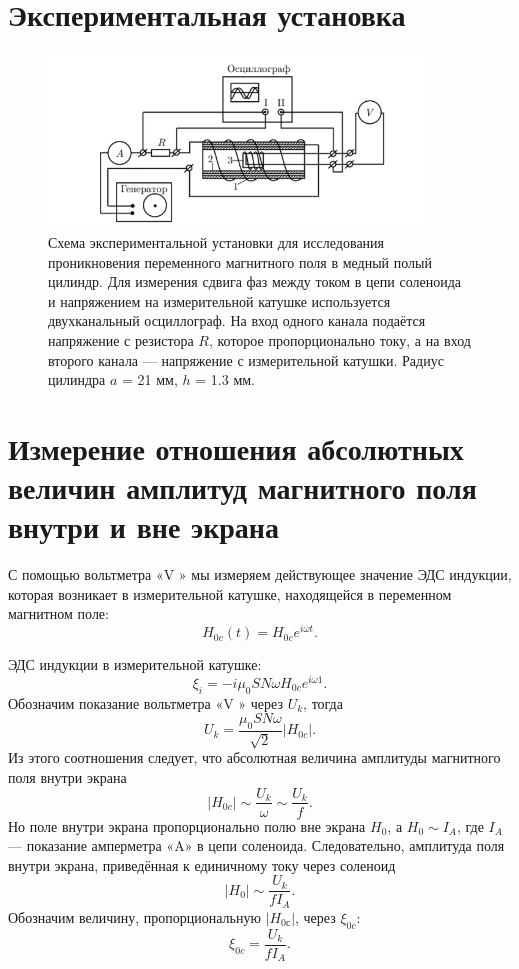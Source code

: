 \documentclass[a4paper, 14pt]{extarticle}%
\newcommand\ECaption[1]{%
     \captionsetup{font=footnotesize}%
     \caption{#1}}
\begin{document}
\section*{Экспериментальная установка}

\begin{figure}[h]
\begin{center}
\includegraphics[width=0.9\textwidth]{ust}
\end{center}
\ECaption{Схема экспериментальной установки для
исследования проникновения переменного магнитного поля в медный полый
цилиндр. Для измерения сдвига фаз между током в цепи соленоида и напряжением на измерительной
катушке используется двухканальный осциллограф. На вход одного канала
подаётся напряжение с резистора $R$, которое пропорционально току, а на
вход второго канала — напряжение с измерительной катушки. Радиус цилиндра $a$ = 21 мм, $h$ = 1.3 мм.}
\end{figure}

\section*{Измерение отношения абсолютных величин амплитуд магнитного поля внутри и вне экрана}
С помощью вольтметра «V » мы измеряем действующее значение ЭДС
индукции, которая возникает в измерительной катушке, находящейся в переменном магнитном поле:
\[H_{0c}(t) = H_{0c} e^{i\omega t}.\]

ЭДС индукции в измерительной катушке:
\[\xi_i= -i\mu_0SN\omega H_{0c}e^{i\omega 1}.\]
Обозначим показание вольтметра «V » через $U_k$, тогда
\[U_k = \dfrac{\mu_0SN\omega}{\sqrt{2}}|H_{0c}|.\]
Из этого соотношения следует, что абсолютная величина амплитуды магнитного поля внутри экрана
\[|H_{0c}| \sim \dfrac{U_k}{\omega}\sim \dfrac{U_k}{f}.\]
Но поле внутри экрана
пропорционально полю вне экрана
$H_0$, а
 $H_0 \sim I_A$, где
$I_A$
— показание амперметра «A» в цепи соленоида. Следовательно, амплитуда поля внутри экрана,
приведённая
к единичному току через соленоид
\[|H_0|\sim\dfrac{U_k}{fI_A}.\]
Обозначим величину, пропорциональную $|H_{0с}|$, через $\xi_{0c}$:
\begin{equation}
\xi_{0c} = \dfrac{U_k}{fI_A}.
\end{equation}
\end{document}

